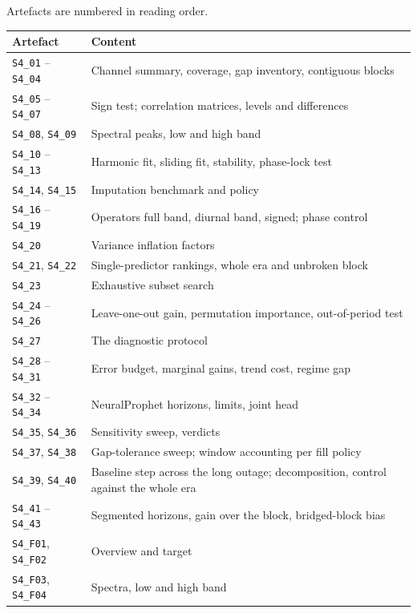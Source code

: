 \documentclass[11pt,a4paper]{article}
\begin{document}
Artefacts are numbered in reading order.

\begin{center}
\small
\begin{tabularx}{\textwidth}{L{4.2cm}Y}
\toprule
\textbf{Artefact} & \textbf{Content} \\
\midrule
\texttt{S4\_01} -- \texttt{S4\_04} & Channel summary, coverage, gap inventory,
contiguous blocks \\
\texttt{S4\_05} -- \texttt{S4\_07} & Sign test; correlation matrices, levels and
differences \\
\texttt{S4\_08}, \texttt{S4\_09} & Spectral peaks, low and high band \\
\texttt{S4\_10} -- \texttt{S4\_13} & Harmonic fit, sliding fit, stability,
phase-lock test \\
\texttt{S4\_14}, \texttt{S4\_15} & Imputation benchmark and policy \\
\texttt{S4\_16} -- \texttt{S4\_19} & Operators full band, diurnal band, signed;
phase control \\
\texttt{S4\_20} & Variance inflation factors \\
\texttt{S4\_21}, \texttt{S4\_22} & Single-predictor rankings, whole era and
unbroken block \\
\texttt{S4\_23} & Exhaustive subset search \\
\texttt{S4\_24} -- \texttt{S4\_26} & Leave-one-out gain, permutation importance,
out-of-period test \\
\texttt{S4\_27} & The diagnostic protocol \\
\texttt{S4\_28} -- \texttt{S4\_31} & Error budget, marginal gains, trend cost,
regime gap \\
\texttt{S4\_32} -- \texttt{S4\_34} & NeuralProphet horizons, limits, joint head \\
\texttt{S4\_35}, \texttt{S4\_36} & Sensitivity sweep, verdicts \\
\texttt{S4\_37}, \texttt{S4\_38} & Gap-tolerance sweep; window accounting per
fill policy \\
\texttt{S4\_39}, \texttt{S4\_40} & Baseline step across the long outage;
decomposition, control against the whole era \\
\texttt{S4\_41} -- \texttt{S4\_43} & Segmented horizons, gain over the block,
bridged-block bias \\
\addlinespace
\texttt{S4\_F01}, \texttt{S4\_F02} & Overview and target \\
\texttt{S4\_F03}, \texttt{S4\_F04} & Spectra, low and high band \\

\end{tabularx}
\end{center}
\end{document}
